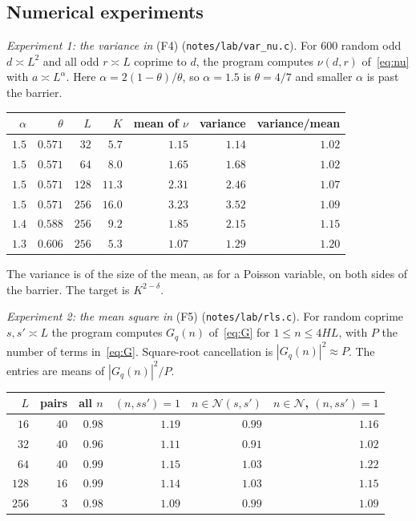 \documentclass[11pt]{amsart}
\theoremstyle{definition}
\theoremstyle{remark}
\numberwithin{equation}{section}
\begin{document}
\subsection{Numerical experiments}\label{sec:numerics}
\emph{Experiment 1: the variance in} (F4) (\texttt{notes/lab/var\_nu.c}).
For $600$ random odd $d\asymp L^2$ and all odd $r\asymp L$ coprime to $d$,
the program computes $\nu(d,r)$ of~\eqref{eq:nu} with $a\asymp L^{\alpha}$.
Here $\alpha=2(1-\theta)/\theta$, so $\alpha=1.5$ is $\theta=4/7$ and
smaller $\alpha$ is past the barrier.

\medskip
\begin{center}
\begin{tabular}{rrrrrrr}
$\alpha$ & $\theta$ & $L$ & $K$ & mean of $\nu$ & variance & variance/mean\\ \hline
$1.5$ & $0.571$ & $32$ & $5.7$ & $1.15$ & $1.14$ & $1.02$\\
$1.5$ & $0.571$ & $64$ & $8.0$ & $1.65$ & $1.68$ & $1.02$\\
$1.5$ & $0.571$ & $128$ & $11.3$ & $2.31$ & $2.46$ & $1.07$\\
$1.5$ & $0.571$ & $256$ & $16.0$ & $3.23$ & $3.52$ & $1.09$\\
$1.4$ & $0.588$ & $256$ & $9.2$ & $1.85$ & $2.15$ & $1.15$\\
$1.3$ & $0.606$ & $256$ & $5.3$ & $1.07$ & $1.29$ & $1.20$
\end{tabular}
\end{center}
\medskip

The variance is of the size of the mean, as for a Poisson variable, on both
sides of the barrier.  The target is $K^{2-\delta}$.

\emph{Experiment 2: the mean square in} (F5) (\texttt{notes/lab/rls.c}).
For random coprime $s,s'\asymp L$ the program computes $G_q(n)$
of~\eqref{eq:G} for $1\le n\le4HL$, with $P$ the number of terms
in~\eqref{eq:G}.  Square-root cancellation is $|G_q(n)|^2\approx P$.  The
entries are means of $|G_q(n)|^2/P$.

\medskip
\begin{center}
\begin{tabular}{rrrrrr}
$L$ & pairs & all $n$ & $(n,ss')=1$ & $n\in\mathcal N(s,s')$ &
$n\in\mathcal N$, $(n,ss')=1$\\ \hline
$16$ & $40$ & $0.98$ & $1.19$ & $0.99$ & $1.16$\\
$32$ & $40$ & $0.96$ & $1.11$ & $0.91$ & $1.02$\\
$64$ & $40$ & $0.99$ & $1.15$ & $1.03$ & $1.22$\\
$128$ & $16$ & $0.99$ & $1.14$ & $1.03$ & $1.15$\\
$256$ & $3$ & $0.98$ & $1.09$ & $0.99$ & $1.09$
\end{tabular}
\end{center}
\medskip
\end{document}
